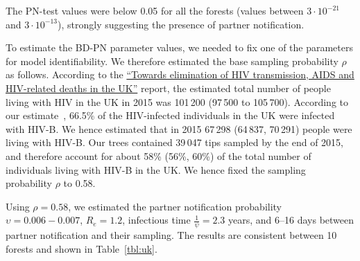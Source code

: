 \documentclass[a4paper,10pt]{article}
\begin{document}
The PN-test values were below 0.05 for all the forests (values between $3 \cdot 10^{-21}$ and $3 \cdot 10^{-13}$), strongly suggesting the presence of partner notification.

To estimate the BD-PN parameter values, we needed to fix one of the parameters for model identifiability. We therefore estimated the base sampling probability $\rho$ as follows. According to the \href{https://webarchive.nationalarchives.gov.uk/ukgwa/20181112132123mp_/https://assets.publishing.service.gov.uk/government/uploads/system/uploads/attachment_data/file/602942/HIV_in_the_UK_report.pdf}{``Towards elimination of HIV transmission, AIDS and HIV-related deaths in the UK''}
 report, the estimated total number of people living with HIV in the UK in 2015 was 101\,200 (97\,500 to 105\,700). %
According to our estimate~\citep{zhukovaModelingDrugResistance2023}, 66.5\% of the HIV-infected individuals in the UK were infected with HIV-B. We hence estimated that in 2015 67\,298 (64\,837, 70\,291) people were living with HIV-B. Our trees contained 39\,047 tips sampled by the end of 2015, and therefore account for about 58\% (56\%, 60\%) of the total number of individuals living with HIV-B in the UK. We hence fixed the sampling probability $\rho$ to 0.58. %
 
 
Using $\rho=0.58$, we estimated the partner notification probability $\upsilon=0.006-0.007$, %
$R_e = 1.2$, infectious time $\frac{1}{\psi} = 2.3$ years, and 6--16 days between partner notification and their sampling. The results are consistent between 10 forests and shown in Table~\ref{tbl:uk}. %
 
\end{document}
